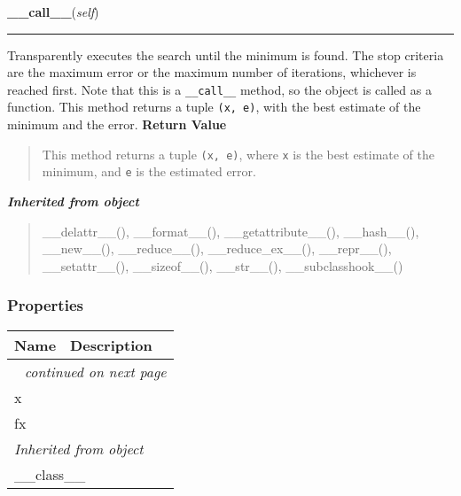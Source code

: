 \hspace{.8\funcindent}\begin{boxedminipage}{\funcwidth}

    \raggedright \textbf{\_\_call\_\_}(\textit{self})

    \vspace{-1.5ex}

    \rule{\textwidth}{0.5\fboxrule}
\setlength{\parskip}{2ex}

Transparently executes the search until the minimum is found. The stop
criteria are the maximum error or the maximum number of iterations,
whichever is reached first. Note that this is a \texttt{\_\_call\_\_} method, so
the object is called as a function. This method returns a tuple
\texttt{(x, e)}, with the best estimate of the minimum and the error.
\setlength{\parskip}{1ex}
      \textbf{Return Value}
    \vspace{-1ex}

      \begin{quote}

This method returns a tuple \texttt{(x, e)}, where \texttt{x} is the best
estimate of the minimum, and \texttt{e} is the estimated error.
      \end{quote}

    \end{boxedminipage}


\large{\textbf{\textit{Inherited from object}}}

\begin{quote}
\_\_delattr\_\_(), \_\_format\_\_(), \_\_getattribute\_\_(), \_\_hash\_\_(), \_\_new\_\_(), \_\_reduce\_\_(), \_\_reduce\_ex\_\_(), \_\_repr\_\_(), \_\_setattr\_\_(), \_\_sizeof\_\_(), \_\_str\_\_(), \_\_subclasshook\_\_()
\end{quote}


  \subsubsection{Properties}

    \vspace{-1cm}
\hspace{\varindent}\begin{longtable}{|p{\varnamewidth}|p{\vardescrwidth}|l}
\cline{1-2}
\cline{1-2} \centering \textbf{Name} & \centering \textbf{Description}& \\
\cline{1-2}
\endhead\cline{1-2}\multicolumn{3}{r}{\small\textit{continued on next page}}\\\endfoot\cline{1-2}
\endlastfoot\raggedright x\- & &\\
\cline{1-2}
\raggedright f\-x\- & &\\
\cline{1-2}
\multicolumn{2}{|l|}{\textit{Inherited from object}}\\
\multicolumn{2}{|p{\varwidth}|}{\raggedright \_\_class\_\_}\\
\cline{1-2}
\end{longtable}


